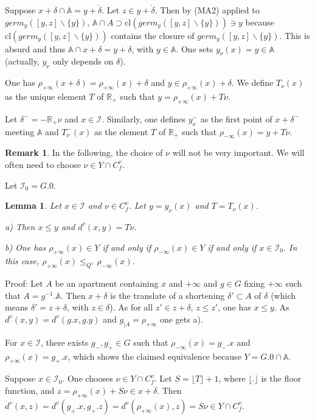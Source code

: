 \documentclass[12pt]{article}
\theoremstyle{plain}
\newtheorem{lemme}[thm]{Lemma}
\theoremstyle{definition}
\newtheorem{rque}[thm]{Remark}
\newcommand{\R}{\mathbb{R}}
\newcommand{\A}{\mathbb{A}}
\newcommand{\I}{\mathcal{I}}
\begin{document}
 Suppose $x+\delta\cap \A=y+\mathring{\delta}$. Let $z\in y+\mathring{\delta}$. Then by (MA2) applied to $germ_y([y,z]\backslash\{y\})$, $\A\cap A\supset \mathrm{cl}(germ_y([y,z]\backslash\{y\}))\ni y$ because $\mathrm{cl}(germ_y([y,z]\backslash\{y\}))$ contains the closure of $germ_y([y,z]\backslash\{y\})$. This is absurd and thus $\A\cap x+\delta=y+\delta$, with $y\in \A$. One sets $y_\nu(x)=y\in\A$ (actually, $y_\nu$ only depends on $\delta$).

One has $\rho_{+\infty}(x+\delta)=\rho_{+\infty}(x)+\delta$ and $y\in \rho_{+\infty}(x)+\delta$. We define $T_\nu(x)$ as the unique element $T$ of $\mathbb{R}_+$ such that $y=\rho_{+\infty}(x)+T\nu$.

Let $\delta^-=-\R_+\nu$ and $x\in \I$. Similarly, one defines $y_\nu^-$ as the first point of $x+\delta^-$ meeting $\A$ and $T^-_\nu(x)$ as the element $T$ of $\R_+$ such that $\rho_{-\infty}(x)=y+T\nu$.

\begin{rque}
In the following, the choice of $\nu$ will not be very important. We will often need to choose $\nu\in Y\cap C^v_f$.
\end{rque}

Let $\I_0=G.0$.


\begin{lemme}\label{lemme distance vectorielle}
Let $x\in \mathcal{I}$ and $\nu\in C_f^v$. Let $y=y_\nu(x)$ and $T=T_\nu(x)$.

a)  Then $x\leq y$ and $d^v(x,y)=T\nu$.

b) One has $\rho_{+\infty}(x)\in Y$ if and only if $\rho_{-\infty}(x)\in Y$ if and only if $x\in \mathcal I_0$. In this case, $\rho_{+\infty}(x)\leq_{Q^\vee} \rho_{-\infty}(x)$.


\end{lemme}

Proof: Let $A$ be an apartment containing $x$ and $+\infty$ and $g\in G$ fixing $+\infty$ such that $A=g^{-1}.\A$. Then $x+\delta$ is the translate of a shortening $\delta'\subset A$ of $\delta$ (which means $\delta'=z+\delta$, with $z\in \delta$). As for all $z'\in z+\delta$, $z\leq z'$, one has $x\leq y$. As $d^v(x,y)=d^v(g.x,g.y)$ and $g_{|A}=\rho_{+\infty}$ one gets a).

For $x\in\mathcal{I}$, there exists $g_-,g_+\in G$ such that $\rho_{-\infty}(x)=g_-.x$ and $\rho_{+\infty}(x)=g_+.x$, which shows the claimed equivalence because $Y=G.0\cap \mathbb{A}$.

Suppose $x\in \mathcal{I}_0$. One chooses $\nu\in Y\cap C_f^v$. Let $S=\lfloor T\rfloor +1$, where $\lfloor.\rfloor$ is the floor function, and $z=\rho_{+\infty}(x)+S\nu\in x+\delta$. Then $d^v(x,z)=d^v(g_+.x,g_+.z)=d^v(\rho_{+\infty}(x),z)=S\nu\in Y\cap C^v_f$.
\end{document}
